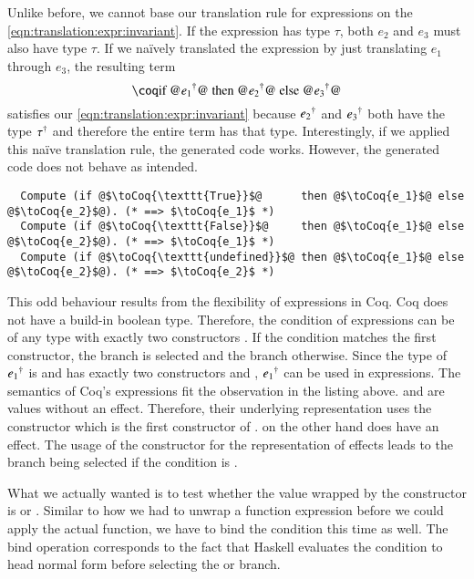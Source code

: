 Unlike before, we cannot base our translation rule for  expressions on the \ref{eqn:translation:expr:invariant}.
If the expression  has type $\tau$, both $e_2$ and $e_3$ must also have type $\tau$.
If we naïvely translated the expression by just translating $e_1$ through $e_3$, the resulting term
\[
  \coqM{if @$\toCoqX{e_1}$@ then @$\toCoqX{e_2}$@ else @$\toCoqX{e_3}$@}
\]
satisfies our \ref{eqn:translation:expr:invariant} because ${e_2}^{\dagger}$ and ${e_3}^{\dagger}$ both have the type ${\tau}^{\dagger}$ and therefore the entire term has that type.
Interestingly, if we applied this naïve translation rule, the generated code works.
However, the generated code does not behave as intended.
\begin{verbatim}
  Compute (if @$\toCoq{\texttt{True}}$@      then @$\toCoq{e_1}$@ else @$\toCoq{e_2}$@). (* ==> $\toCoq{e_1}$ *)
  Compute (if @$\toCoq{\texttt{False}}$@     then @$\toCoq{e_1}$@ else @$\toCoq{e_2}$@). (* ==> $\toCoq{e_1}$ *)
  Compute (if @$\toCoq{\texttt{undefined}}$@ then @$\toCoq{e_1}$@ else @$\toCoq{e_2}$@). (* ==> $\toCoq{e_2}$ *)
\end{verbatim}
This odd behaviour results from the flexibility of  expressions in Coq.
Coq does not have a build-in boolean type.
Therefore, the condition of  expressions can be of any type with exactly two constructors \cite[p.~48]{CoqDevTeam:2018}.
If the condition matches the first constructor, the  branch is selected and the  branch otherwise.
Since the type of ${e_1}^{\dagger}$ is  and  has exactly two constructors  and , ${e_1}^{\dagger}$ can be used in  expressions.
The semantics of Coq's  expressions fit the observation in the listing above.
 and  are values without an effect.
Therefore, their underlying representation uses the  constructor which is the first constructor of .
 on the other hand does have an effect.
The usage of the  constructor for the representation of effects leads to the  branch being selected if the condition is .

What we actually wanted is to test whether the value wrapped by the  constructor is  or .
Similar to how we had to unwrap a function expression before we could apply the actual function, we have to bind the condition this time as well.
The bind operation corresponds to the fact that Haskell evaluates the condition to head normal form \cite[p.~132]{Christiansen:2019} before selecting the  or  branch.

